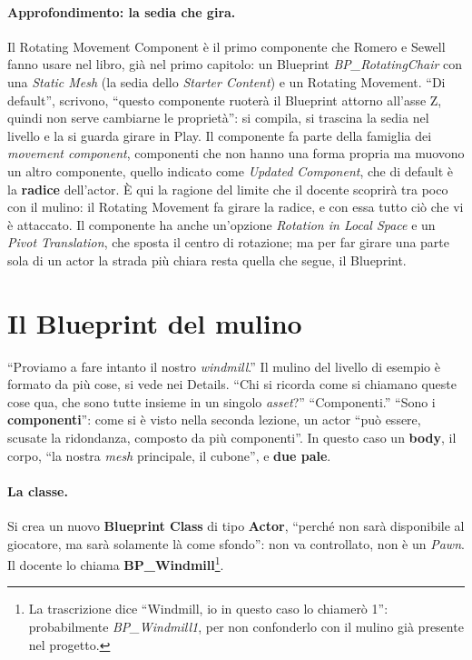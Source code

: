 \paragraph{Approfondimento: la sedia che gira.} Il Rotating Movement Component è il
primo componente che Romero e Sewell fanno usare nel libro, già nel primo capitolo: un
Blueprint \emph{BP\_RotatingChair} con una \emph{Static Mesh} (la sedia dello
\emph{Starter Content}) e un Rotating Movement. ``Di default'', scrivono, ``questo
componente ruoterà il Blueprint attorno all'asse Z, quindi non serve cambiarne le
proprietà'': si compila, si trascina la sedia nel livello e la si guarda girare in Play.
Il componente fa parte della famiglia dei \emph{movement component}, componenti che non
hanno una forma propria ma muovono un altro componente, quello indicato come
\emph{Updated Component}, che di default è la \textbf{radice} dell'actor. È qui la
ragione del limite che il docente scoprirà tra poco con il mulino: il Rotating Movement
fa girare la radice, e con essa tutto ciò che vi è attaccato. Il componente ha anche
un'opzione \emph{Rotation in Local Space} e un \emph{Pivot Translation}, che sposta il
centro di rotazione; ma per far girare una parte sola di un actor la strada più chiara
resta quella che segue, il Blueprint.

\section{Il Blueprint del mulino}
\label{ue4:sec:mulino}

``Proviamo a fare intanto il nostro \emph{windmill}.'' Il mulino del livello di esempio
è formato da più cose, si vede nei Details. ``Chi si ricorda come si chiamano queste
cose qua, che sono tutte insieme in un singolo \emph{asset}?'' ``Componenti.''
``Sono i \textbf{componenti}'': come si è visto nella seconda lezione, un actor ``può
essere, scusate la ridondanza, composto da più componenti''. In questo caso un
\textbf{body}, il corpo, ``la nostra \emph{mesh} principale, il cubone'', e
\textbf{due pale}.

\paragraph{La classe.} Si crea un nuovo \textbf{Blueprint Class} di tipo
\textbf{Actor}, ``perché non sarà disponibile al giocatore, ma sarà solamente là come
sfondo'': non va controllato, non è un \emph{Pawn}. Il docente lo chiama
\textbf{BP\_Windmill}\footnote{La trascrizione dice ``Windmill, io in questo caso lo
chiamerò 1'': probabilmente \emph{BP\_Windmill1}, per non confonderlo con il mulino già
presente nel progetto.}.

